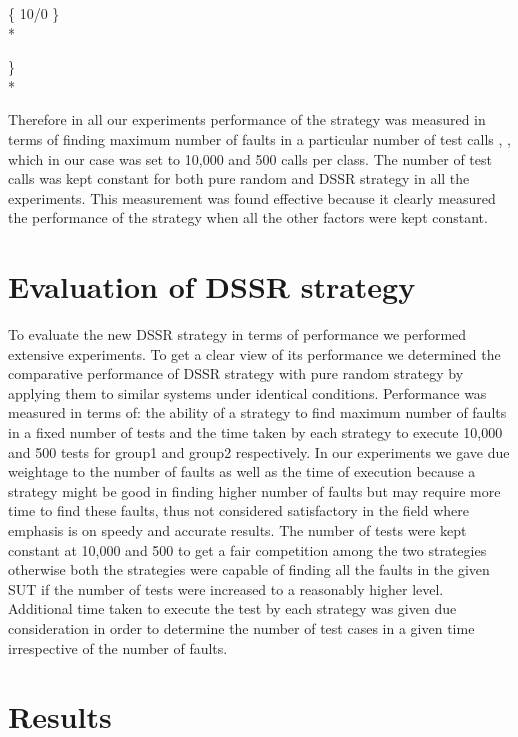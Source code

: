 \documentclass[10pt, conference, compsocconf]{IEEEtran}
\begin{document}
\hspace{07 mm}\{ 10/0 \} \\* 

\} \\*

Therefore in all our experiments performance of the strategy was measured in terms of finding maximum number of faults in a particular number of test calls  \cite{Ciupa2007}, \cite{Pacheco2007a}, \cite{Ciupa2008b} which in our case was set to 10,000 and 500 calls per class. The number of test calls was kept constant for both pure random and DSSR strategy in all the experiments. This measurement was found effective because it clearly measured the performance of the strategy when all the other factors were kept constant.



\section{Evaluation of DSSR strategy}
To evaluate the new DSSR strategy in terms of performance we performed extensive experiments. To get a clear view of its performance we determined the comparative performance of DSSR strategy with pure random strategy by applying them to similar systems under identical conditions. Performance was measured in terms of: the ability of a strategy to find maximum number of faults in a fixed number of tests and the time taken by each strategy to execute 10,000 and 500 tests for group1 and group2 respectively. In our experiments we gave due weightage to the number of faults as well as the time of execution because a strategy might be good in finding higher number of faults but may require more time to find these faults, thus not considered satisfactory in the field where emphasis is on speedy and accurate results. The number of tests were kept constant at 10,000 and 500 to get a fair competition among the two strategies otherwise both the strategies were capable of finding all the faults in the given SUT if the number of tests were increased to a reasonably higher level. Additional time taken to execute the test by each strategy was given due consideration in order to determine the number of test cases in a given time irrespective of the number of faults. 

\section{Results}
\end{document}
